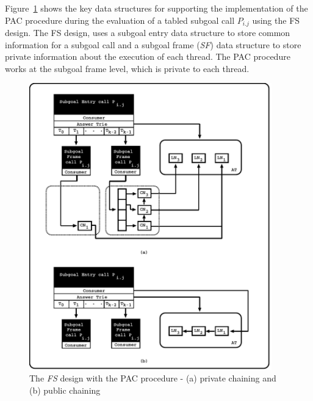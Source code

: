 \documentclass{llncs}
\begin{document}
Figure~\ref{fig_tabtries_pcc} shows the key data structures for
supporting the implementation of the PAC procedure during the
evaluation of a tabled subgoal call $P_{i.j}$ using the FS design. The
FS design, uses a subgoal entry data structure to store common
information for a subgoal call and a subgoal frame (\emph{SF}) data
structure to store private information about the execution of each
thread. The PAC procedure works at the subgoal frame level, which is
private to each thread. 

\begin{figure}[!ht]
\centering
\includegraphics[width=10.5cm]{figures/pcc.pdf}
\caption{The \emph{FS} design with the PAC procedure - (a) private
  chaining and (b) public chaining}
\label{fig_tabtries_pcc}
\end{figure}
\end{document}
